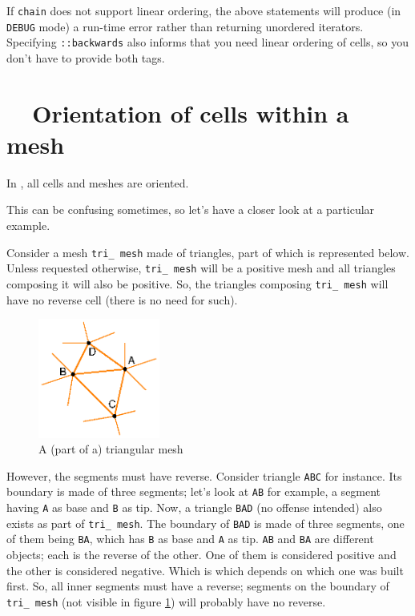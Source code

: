 If {\small\tt chain} does not support linear ordering, the above statements will produce
(in {\small\tt DEBUG} mode) a run-time error rather than returning unordered iterators.
Specifying {\small\tt{}::backwards} also informs {\maniFEM} that you need
linear ordering of cells, so you don't have to provide both tags.

\section{~~Orientation of cells within a mesh}\label{\numb section 9.\numb parag 7}

In \maniFEM, all cells and meshes are oriented.

This can be confusing sometimes, so let's have a closer look at a particular example.

Consider a mesh {\small\tt tri\_\,mesh} made of triangles, part of which is represented below.
Unless requested otherwise, {\small\tt tri\_\,mesh} will be a positive mesh and all triangles
composing it will also be positive.
So, the triangles composing {\small\tt tri\_\,mesh} will have no reverse cell
(there is no need for such).

\begin{figure}[ht] \centering
  \includegraphics[width=40mm]{malha-tri}
  \caption{A (part of a) triangular mesh}
  \label{\numb section 9.\numb fig 2}
\end{figure}

However, the segments must have reverse.
Consider triangle {\small\tt ABC} for instance.
Its boundary is made of three segments; let's look at {\small\tt AB} for example,
a segment having {\small\tt A} as base and {\small\tt B} as tip.
Now, a triangle {\small\tt BAD} (no offense intended) also exists as part of
{\small\tt tri\_\,mesh}.
The boundary of {\small\tt BAD} is made of three segments, one of them being {\small\tt BA},
which has {\small\tt B} as base and {\small\tt A} as tip.
{\small\tt AB} and {\small\tt BA} are different {\small\tt {}} objects;
each is the reverse of the other.
One of them is considered positive and the other is considered negative.
Which is which depends on which one was built first.
So, all inner segments must have a reverse;
segments on the boundary of {\small\tt tri\_\,mesh} (not visible in figure
\ref{\numb section 9.\numb fig 2}) will probably have no reverse.

